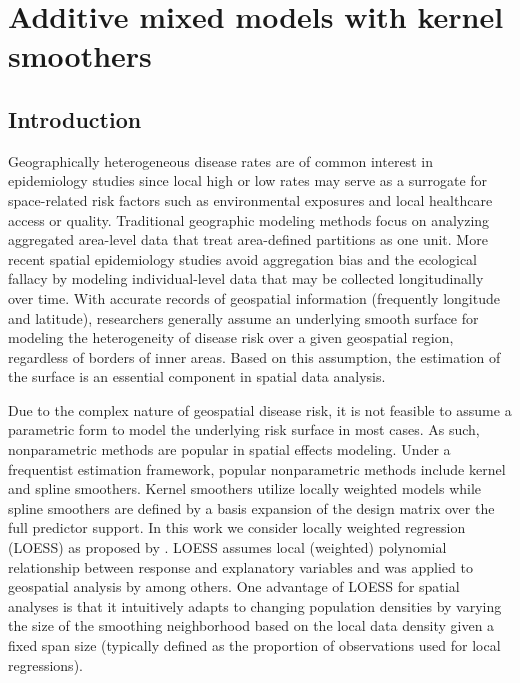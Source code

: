 \chapter{Additive mixed models with kernel smoothers}

	\section{Introduction}
	\label{s:intro}
	Geographically heterogeneous disease rates are of common interest in epidemiology studies since local high or low rates may serve as a surrogate for space-related risk factors such as environmental exposures and local healthcare access or quality. Traditional geographic modeling methods focus on analyzing aggregated area-level data that treat area-defined partitions as one unit. More recent spatial epidemiology studies avoid aggregation bias and the ecological fallacy by modeling individual-level data that may be collected longitudinally over time.  With accurate records of geospatial information (frequently longitude and latitude), researchers generally assume an underlying smooth surface for modeling the heterogeneity of disease risk over a given geospatial region, regardless of borders of inner areas. Based on this assumption, the estimation of the surface is an essential component in spatial data analysis. 
	
	Due to the complex nature of geospatial disease risk, it is not feasible to assume a parametric form to model the underlying risk surface in most cases. As such, nonparametric methods are popular in spatial effects modeling. Under a frequentist estimation framework, popular nonparametric methods include kernel and spline smoothers. Kernel smoothers utilize locally weighted models while spline smoothers are defined by a basis expansion of the design matrix over the full predictor support. In this work we consider locally weighted regression (LOESS) as proposed by \citet{cleveland1979robust}. LOESS assumes local (weighted) polynomial relationship between response and explanatory variables and was applied to geospatial analysis by \citet{brunsdon1996geographically} among others. One advantage of LOESS for spatial analyses is that it intuitively adapts to changing population densities by varying the size of the smoothing neighborhood based on the local data density given a fixed span size (typically defined as the proportion of observations used for local regressions). %
	
